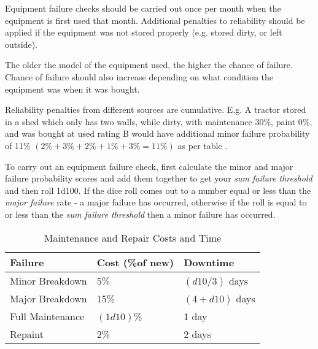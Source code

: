 \documentclass[a4paper,10pt]{article}
\begin{document}
Equipment failure checks should be carried out once per month when the equipment
is first used that month. Additional penalties to reliability should be applied
if the equipment was not stored properly (e.g. stored dirty, or left outside).

The older the model of the equipment used, the higher the chance of failure.
Chance of failure should also increase depending on what condition the equipment
was when it was bought.

Reliability penalties from different sources are cumulative. E.g. A tractor
stored in a shed which only has two walls, while dirty, with maintenance 30\%,
paint 0\%, and was bought at used rating B would have additional minor failure
probability of 11\% $(2\% + 3\% + 2\% + 1\% + 3\% = 11\%)$ as per table
.

To carry out an equipment failure check, first calculate the minor and major
failure probability scores and add them together to get your \textit{sum failure
  threshold} and then roll 1d100. If the dice roll comes out to a number equal
or less than the \textit{major failure} rate - a major failure has occurred,
otherwise if the roll is equal to or less than the \textit{sum failure
  threshold} then a minor failure has occurred.

\begin{table}
\begin{center}
  \caption{Maintenance and Repair Costs and Time}
  \begin{tabular}{lll}
    \toprule
    Failure          & Cost (\%of new) & Downtime  \\
    \midrule
    Minor Breakdown  & 5\%             & $(d10 / 3)$ days\\
    Major Breakdown  & 15\%            & $(4 + d10)$ days \\
    Full Maintenance & $(1d10)$\%      & 1 day\\
    Repaint          & 2\%             & 2 days\\
    \bottomrule
  \end{tabular}
\end{center}
\end{table}
\end{document}
